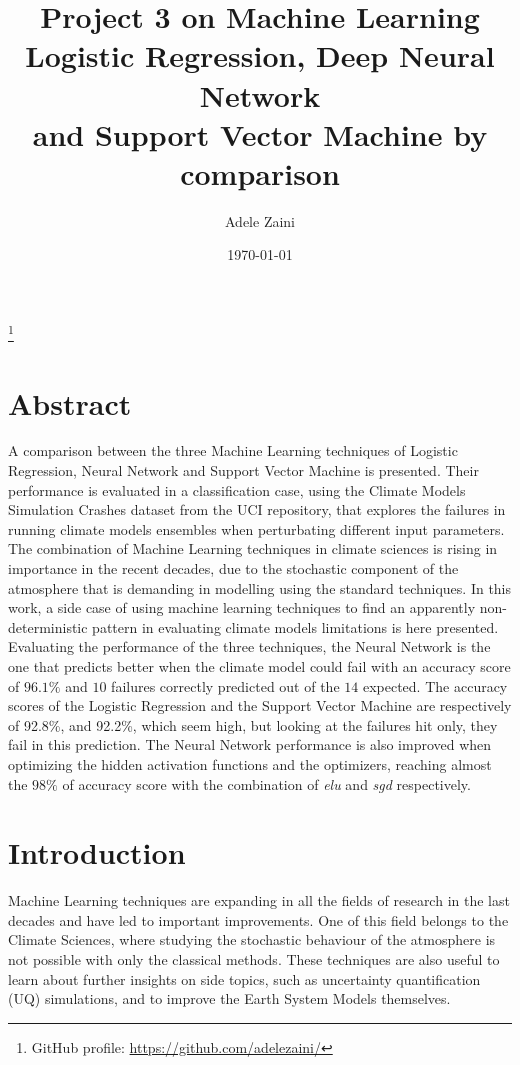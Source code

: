 \documentclass[english,notitlepage,reprint,nofootinbib]{revtex4-1}  %
\begin{document}
\title{\LARGE{Project 3 on Machine Learning}\\
  \large{Logistic Regression, Deep Neural Network \\ and Support Vector Machine by comparison}}
\author{Adele Zaini}
\thanks{GitHub profile: \href{https://github.com/adelezaini/}{ https://github.com/adelezaini/}}
\date{\today}
\noaffiliation                            %

\maketitle
\section*{Abstract}

A comparison between the three Machine Learning techniques of Logistic Regression, Neural Network and Support Vector Machine is presented. Their performance is evaluated in a classification case, using the Climate Models Simulation Crashes dataset from the UCI repository, that explores the failures in running climate models ensembles when perturbating different input parameters. The combination of Machine Learning techniques in climate sciences is rising in importance in the recent decades, due to the stochastic component of the atmosphere that is demanding in modelling using the standard techniques. In this work, a side case of using machine learning techniques to find an apparently non-deterministic pattern in evaluating climate models limitations is here presented. Evaluating the performance of the three techniques, the Neural Network is the one that predicts better when the climate model could fail with an accuracy score of $96.1\%$ and $10$ failures correctly predicted out of the $14$ expected. The accuracy scores of the Logistic Regression and the Support Vector Machine are respectively of 92.8\%, and 92.2\%, which seem high, but looking at the failures hit only, they fail in this prediction. The Neural Network performance is also improved when optimizing the hidden activation functions and the optimizers, reaching almost the $98\%$ of accuracy score with the combination of \textit{elu} and \textit{sgd} respectively.


\section{Introduction}
Machine Learning techniques are expanding in all the fields of research in the last decades and have led to important improvements. One of this field belongs to the Climate Sciences, where studying the stochastic behaviour of the atmosphere is not possible with only the classical methods. These techniques are also useful to learn about further insights on side topics, such as uncertainty quantification (UQ) simulations, and to improve the Earth System Models themselves.
\end{document}
